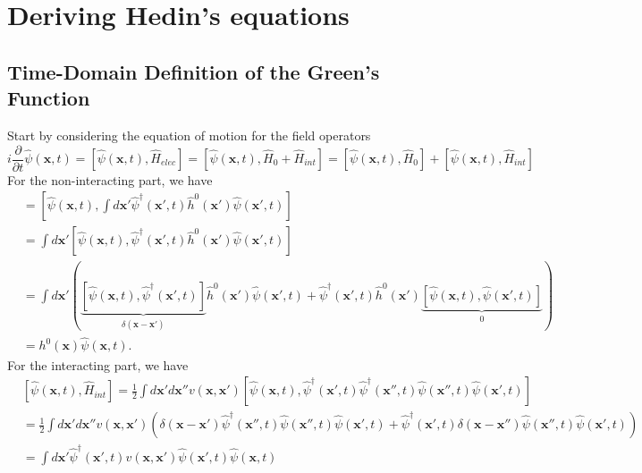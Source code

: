 \section{Deriving Hedin's equations}
\subsection{Time-Domain Definition of the Green's Function}
Start by considering the equation of motion for the field operators
\begin{equation}
  i\frac{\partial}{\partial t}\hat{\psi}(\mathbf{x}, t) = [\hat{\psi}(\mathbf{x}, t),\hat{H}_{elec}] = [\hat{\psi}(\mathbf{x}, t), \hat{H}_0 + \hat{H}_{int}] = [\hat{\psi}(\mathbf{x}, t), \hat{H}_0] + [\hat{\psi}(\mathbf{x}, t), \hat{H}_{int}] 
\end{equation}
For the non-interacting part, we have
\begin{align}
  [\hat{\psi}(\mathbf{x}, t), \hat{H}_0] &= [\hat{\psi}(\mathbf{x}, t), \int d\mathbf{x}' \hat{\psi}^\dagger(\mathbf{x}', t)\hat{h}^0(\mathbf{x}')\hat{\psi}(\mathbf{x}', t)] \\
  &= \int d\mathbf{x}' [\hat{\psi}(\mathbf{x}, t), \hat{\psi}^\dagger(\mathbf{x}', t)\hat{h}^0(\mathbf{x}')\hat{\psi}(\mathbf{x}', t)] \\
  &= \int d\mathbf{x}' \left( \underbrace{[\hat{\psi}(\mathbf{x}, t), \hat{\psi}^\dagger(\mathbf{x}', t)]}_{\delta(\mathbf{x}-\mathbf{x}')}\hat{h}^0(\mathbf{x}')\hat{\psi}(\mathbf{x}', t) + \hat{\psi}^\dagger(\mathbf{x}', t)\hat{h}^0(\mathbf{x}')\underbrace{[\hat{\psi}(\mathbf{x}, t), \hat{\psi}(\mathbf{x}', t)]}_{0} \right) \\
  &= h^0(\mathbf{x})\hat{\psi}(\mathbf{x}, t).
\end{align}
For the interacting part, we have
\begin{align}
 &[\hat{\psi}(\mathbf{x}, t), \hat{H}_{int}] = \frac{1}{2}\int d\mathbf{x}' d\mathbf{x}'' v(\mathbf{x},\mathbf{x}') [ \hat{\psi}(\mathbf{x}, t), \hat{\psi}^\dagger(\mathbf{x}', t)  \hat{\psi}^{\dagger}(\mathbf{x}'', t) \hat{\psi}(\mathbf{x}'', t) \hat{\psi}(\mathbf{x}', t) ] \\
&= \frac{1}{2}\int d\mathbf{x}' d\mathbf{x}'' v(\mathbf{x},\mathbf{x}') \left( \delta (\mathbf{x}-\mathbf{x}') \hat{\psi}^\dagger(\mathbf{x}'', t) \hat{\psi}(\mathbf{x}'', t) \hat{\psi}(\mathbf{x}', t) + \hat{\psi}^\dagger(\mathbf{x}', t) \delta (\mathbf{x}-\mathbf{x}'') \hat{\psi}(\mathbf{x}'', t) \hat{\psi}(\mathbf{x}', t) \right) \\
&= \int d\mathbf{x}' \hat{\psi}^\dagger(\mathbf{x}', t) v(\mathbf{x},\mathbf{x}') \hat{\psi}(\mathbf{x}', t) \hat{\psi}(\mathbf{x}, t)
\end{align}
